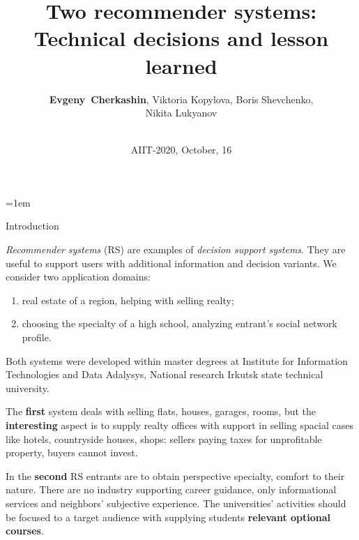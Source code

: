 \documentclass[10pt,dvipsnames]{beamer}
\def\remph#1{\textcolor{Mahogany}{\bfseries #1}}
\begin{document}
\parindent=1em
\title{Two recommender systems: Technical decisions and lesson learned}
\author{
\def\and{, }
\remph{Evgeny~Cherkashin}\and
Viktoria Kopylova\and
Boris Shevchenko\and\\
Nikita Lukyanov}


\date{${}$\\\vspace{2em}AIIT-2020, October, 16}

\maketitle
\begin{frame}{Introduction}

  \emph{Recommender systems} (RS) are examples of \emph{decision support systems}. They are useful to support users with additional information and decision variants.  We consider two application domains:
  \begin{enumerate}
  \item real estate of a region, helping with selling realty;
  \item choosing the specialty of a high school, analyzing entrant's social network profile.
\end{enumerate}
Both systems were developed within master degrees at Institute for Information Technologies and Data Adalysys, National research Irkutsk state technical university.

The \textbf{first} system deals with selling flats, houses, garages, rooms, but the \textbf{interesting} aspect is to supply realty offices with support in selling spacial cases like hotels, countryside houses, shops: sellers paying taxes for unprofitable property, buyers cannot invest.

In the \textbf{second} RS entrants are to obtain perspective specialty, comfort to their nature.  There are no industry supporting career guidance, only informational services and neighbors' subjective experience.  The universities' activities should be focused to a target audience with supplying students \textbf{relevant optional courses}.


\end{frame}
\end{document}
